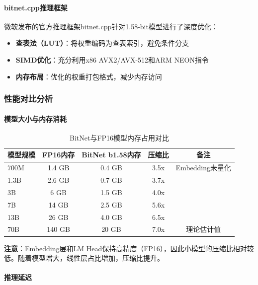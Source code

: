 \documentclass[12pt,a4paper]{article}
\begin{document}
\paragraph{bitnet.cpp推理框架}

微软发布的官方推理框架bitnet.cpp针对1.58-bit模型进行了深度优化：

\begin{itemize}
    \item \textbf{查表法（LUT）}：将权重编码为查表索引，避免条件分支
    \item \textbf{SIMD优化}：充分利用x86 AVX2/AVX-512和ARM NEON指令
    \item \textbf{内存布局}：优化的权重打包格式，减少内存访问
\end{itemize}

\subsubsection{性能对比分析}

\paragraph{模型大小与内存消耗}

\begin{table}[H]
\centering
\caption{BitNet与FP16模型内存占用对比}
\begin{tabular}{lcccc}
\toprule
\textbf{模型规模} & \textbf{FP16内存} & \textbf{BitNet b1.58内存} & \textbf{压缩比} & \textbf{备注} \\
\midrule
700M & 1.4 GB & 0.4 GB & 3.5x & Embedding未量化 \\
1.3B & 2.6 GB & 0.7 GB & 3.7x & \\
3B & 6 GB & 1.5 GB & 4.0x & \\
7B & 14 GB & 2.5 GB & 5.6x & \\
13B & 26 GB & 4.0 GB & 6.5x & \\
70B & 140 GB & 20 GB & 7.0x & 理论估计值 \\
\bottomrule
\end{tabular}
\end{table}

\textbf{注意}：Embedding层和LM Head保持高精度（FP16），因此小模型的压缩比相对较低。随着模型增大，线性层占比增加，压缩比提升。

\paragraph{推理延迟}
\end{document}
